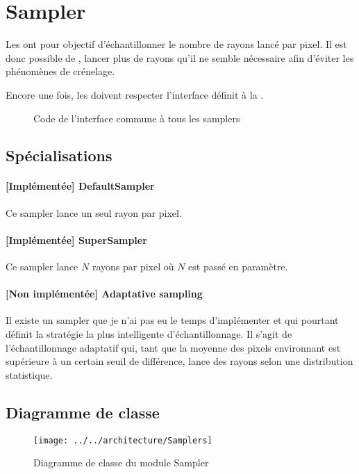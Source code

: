 \section{Sampler}
Les  ont pour objectif d'échantillonner le nombre de rayons
lancé par pixel. Il est donc possible de , \ie lancer plus
de rayons qu'il ne semble nécessaire afin d'éviter les phénomènes de
crénelage.

Encore une fois, les  doivent respecter l'interface définit à la
.

\begin{figure}[h]
  \caption{Code de l'interface commune à tous les
  samplers\label{fig:ISamplers}}
\end{figure}

\subsection{Spécialisations}
\paragraph{[Implémentée] DefaultSampler} Ce sampler lance un seul rayon par pixel.

\paragraph{[Implémentée] SuperSampler} Ce sampler lance $N$ rayons par pixel où $N$ est
passé en paramètre.

\paragraph{[Non implémentée] Adaptative sampling} Il existe un sampler que je
n'ai pas eu le temps d'implémenter et qui pourtant définit la stratégie la
plus intelligente d'échantillonnage. Il s'agit de l'échantillonnage adaptatif
qui, tant que la moyenne des pixels environnant est supérieure à un certain
seuil de différence, lance des rayons selon une distribution statistique.

\subsection{Diagramme de classe}
\begin{figure}[h]
\begin{center}
  \texttt{[image: ../../architecture/Samplers]}
  \caption{Diagramme de classe du module Sampler\label{fig:CDSamplers}}
\end{center}
\end{figure}
